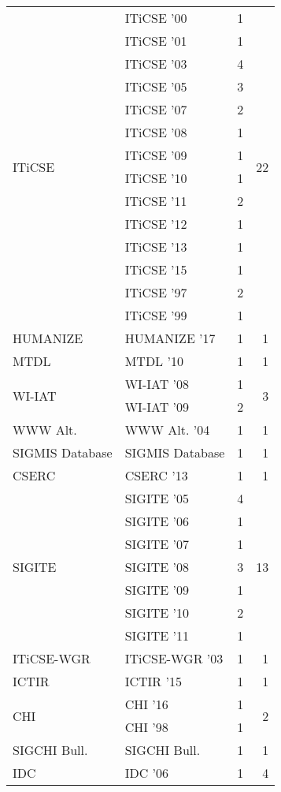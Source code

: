 \begin{table*}[t]
\begin{tabular}{llrr}
\multirow{14}{*}{ITiCSE } & ITiCSE '00 & 1 & \multirow{14}{*}{22}\\
& ITiCSE '01 & 1 &\\
& ITiCSE '03 & 4 &\\
& ITiCSE '05 & 3 &\\
& ITiCSE '07 & 2 &\\
& ITiCSE '08 & 1 &\\
& ITiCSE '09 & 1 &\\
& ITiCSE '10 & 1 &\\
& ITiCSE '11 & 2 &\\
& ITiCSE '12 & 1 &\\
& ITiCSE '13 & 1 &\\
& ITiCSE '15 & 1 &\\
& ITiCSE '97 & 2 &\\
& ITiCSE '99 & 1 &\\
\multirow{1}{*}{HUMANIZE } & HUMANIZE '17 & 1 & \multirow{1}{*}{1}\\
\multirow{1}{*}{MTDL } & MTDL '10 & 1 & \multirow{1}{*}{1}\\
\multirow{2}{*}{WI-IAT } & WI-IAT '08 & 1 & \multirow{2}{*}{3}\\
& WI-IAT '09 & 2 &\\
\multirow{1}{*}{WWW Alt. } & WWW Alt. '04 & 1 & \multirow{1}{*}{1}\\
\multirow{1}{*}{SIGMIS Database} & SIGMIS Database & 1 & \multirow{1}{*}{1}\\
\multirow{1}{*}{CSERC } & CSERC '13 & 1 & \multirow{1}{*}{1}\\
\multirow{7}{*}{SIGITE } & SIGITE '05 & 4 & \multirow{7}{*}{13}\\
& SIGITE '06 & 1 &\\
& SIGITE '07 & 1 &\\
& SIGITE '08 & 3 &\\
& SIGITE '09 & 1 &\\
& SIGITE '10 & 2 &\\
& SIGITE '11 & 1 &\\
\multirow{1}{*}{ITiCSE-WGR } & ITiCSE-WGR '03 & 1 & \multirow{1}{*}{1}\\
\multirow{1}{*}{ICTIR } & ICTIR '15 & 1 & \multirow{1}{*}{1}\\
\multirow{2}{*}{CHI } & CHI '16 & 1 & \multirow{2}{*}{2}\\
& CHI '98 & 1 &\\
\multirow{1}{*}{SIGCHI Bull.} & SIGCHI Bull. & 1 & \multirow{1}{*}{1}\\
\multirow{4}{*}{IDC } & IDC '06 & 1 & \multirow{4}{*}{4}\\

\end{tabular}
\end{table*}
